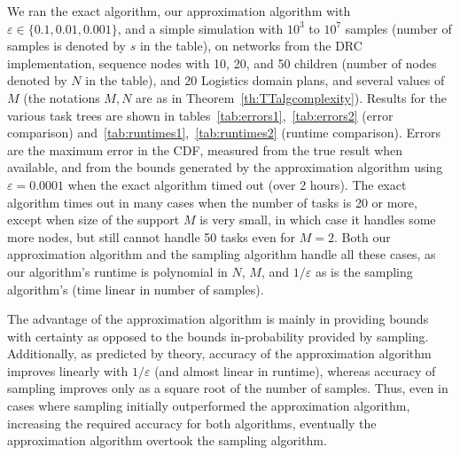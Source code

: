 \documentclass[review]{elsarticle}
\begin{document}
We ran the exact algorithm, our approximation algorithm with $\varepsilon \in \{ 0.1, 0.01, 0.001\}$, and a simple simulation with 
$10^3$ to $10^7$ samples 
(number of samples is denoted by $s$ in the table), on networks from the DRC
implementation, sequence nodes with 10, 20, and 50 children (number of nodes denoted by $N$ in the table), and 20 Logistics domain plans, and
several values of $M$ (the notations $M, N$ are as in Theorem~\ref{th:TTalgcomplexity}). 
Results for the various task trees are shown in tables~\ref{tab:errors1},~\ref{tab:errors2} (error comparison) and~\ref{tab:runtimes1},~\ref{tab:runtimes2} (runtime comparison).
Errors are the maximum error in the CDF, measured from the true result when available, and from the bounds generated by the approximation algorithm using $\varepsilon = 0.0001$
when the exact algorithm timed out (over 2 hours). 
The exact algorithm times out in many cases when the number of tasks is 20 or more, except when size of the support $M$ is very small, in which case it handles some more nodes, but still cannot handle 
50 tasks even for $M=2$.
Both our approximation algorithm and the sampling algorithm handle all these cases, as our algorithm's runtime is polynomial in 
$N$, $M$, and ${1}/{\varepsilon}$
as is the sampling algorithm's (time linear in number of samples). 

The advantage of the approximation algorithm is mainly in providing bounds with
certainty as opposed to the bounds in-probability provided by sampling. 
Additionally, as predicted by theory, accuracy of the approximation algorithm
improves linearly with ${1}/{\varepsilon}$ (and almost linear in runtime), whereas accuracy of sampling improves only as a square root of the number of
samples. Thus, even in cases where sampling initially outperformed the approximation algorithm, increasing the required accuracy for both algorithms,
eventually the approximation algorithm overtook the sampling algorithm.
\end{document}
